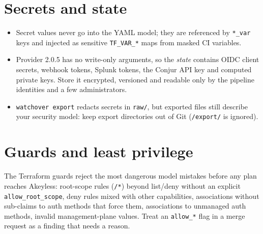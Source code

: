 \section{Secrets and state}
\begin{itemize}
\item Secret values never go into the YAML model; they are referenced by \texttt{*\_var} keys and
  injected as sensitive \texttt{TF\_VAR\_*} maps from masked CI variables.
\item Provider 2.0.5 has no write-only arguments, so the \emph{state} contains OIDC client
  secrets, webhook tokens, Splunk tokens, the Conjur API key and computed private keys. Store it
  encrypted, versioned and readable only by the pipeline identities and a few administrators.
\item \texttt{watchover export} redacts secrets in \texttt{raw/}, but exported files still describe
  your security model: keep export directories out of Git (\texttt{/export/} is ignored).
\end{itemize}

\section{Guards and least privilege}
The Terraform guards reject the most dangerous model mistakes before any plan reaches Akeyless:
root-scope rules (\texttt{/*}) beyond list/deny without an explicit \texttt{allow\_root\_scope},
deny rules mixed with other capabilities, associations without sub-claims to auth methods that
force them, associations to unmanaged auth methods, invalid management-plane values. Treat an
\texttt{allow\_*} flag in a merge request as a finding that needs a reason.

